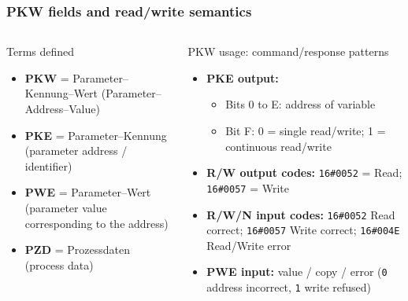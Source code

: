 \begin{frame}
	\frametitle{PKW fields and read/write semantics}
	\small
	\begin{columns}[T]
			\begin{block}{Terms defined}
				\begin{itemize}
					\item \textbf{PKW} = Parameter--Kennung--Wert (Parameter--Address--Value)
					\item \textbf{PKE} = Parameter--Kennung (parameter address / identifier)
					\item \textbf{PWE} = Parameter--Wert (parameter value corresponding to the address)
					\item \textbf{PZD} = Prozessdaten (process data)
				\end{itemize}
			\end{block}
			\begin{block}{PKW usage: command/response patterns}
				\begin{itemize}
					\item \textbf{PKE output:}
					\begin{itemize}
						\item Bits 0 to E: address of variable
						\item Bit F: 0 = single read/write; 1 = continuous read/write
					\end{itemize}
					\item \textbf{R/W output codes:} \texttt{16\#0052} = Read; \texttt{16\#0057} = Write
					\item \textbf{R/W/N input codes:} \texttt{16\#0052} Read correct; \texttt{16\#0057} Write correct; \texttt{16\#004E} Read/Write error
					\item \textbf{PWE input:} value / copy / error (\texttt{0} address incorrect, \texttt{1} write refused)
				\end{itemize}
			\end{block}
	\end{columns}
\end{frame}

